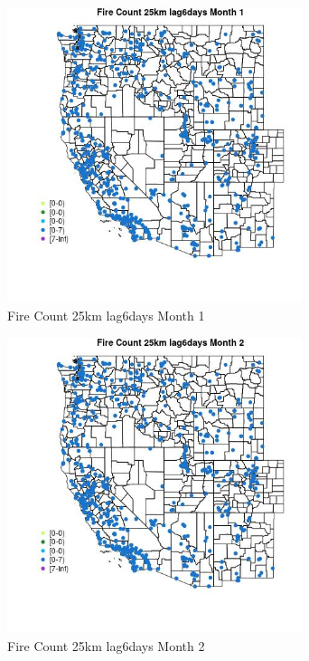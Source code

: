 \begin{figure} 
\centering  
\includegraphics[width=0.77\textwidth]{Code_Outputs/Report_ML_input_PM25_Step4_part_e_de_duplicated_aves_compiled_2019-05-21wNAs_MapObsMo1Fire_Count_25km_lag6days.jpg} 
\caption{\label{fig:Report_ML_input_PM25_Step4_part_e_de_duplicated_aves_compiled_2019-05-21wNAsMapObsMo1Fire_Count_25km_lag6days}Fire Count 25km lag6days Month 1} 
\end{figure} 
 

\begin{figure} 
\centering  
\includegraphics[width=0.77\textwidth]{Code_Outputs/Report_ML_input_PM25_Step4_part_e_de_duplicated_aves_compiled_2019-05-21wNAs_MapObsMo2Fire_Count_25km_lag6days.jpg} 
\caption{\label{fig:Report_ML_input_PM25_Step4_part_e_de_duplicated_aves_compiled_2019-05-21wNAsMapObsMo2Fire_Count_25km_lag6days}Fire Count 25km lag6days Month 2} 
\end{figure} 
 

